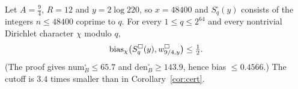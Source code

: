 \begin{corollary}\label{cor:convcert}
Let $A=\frac94$, $R=12$ and $y=2\log220$, so $x=48400$ and $S^\square_q(y)$ consists of the integers $n\le48400$ coprime to $q$.
For every $1\le q\le2^{64}$ and every nontrivial Dirichlet character $\chi$ modulo $q$,
\[
  \operatorname{bias}_\chi\bigl(S^\square_q(y),w^\square_{9/4,y}\bigr)\le\tfrac12 .
\]
(The proof gives $\mathrm{num}^\square_B\le65.7$ and $\mathrm{den}^\square_B\ge143.9$, hence bias $\le0.4566$.) The cutoff is $3.4$ times
smaller than in Corollary~\ref{cor:cert}.
\end{corollary}
